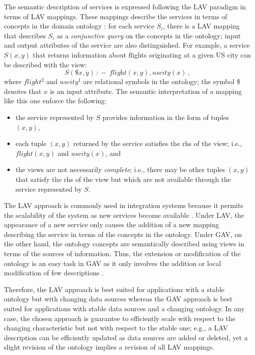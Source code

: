 \documentclass{llncs}
\newcommand{\qrule}{:\!\!-}
\newcommand{\flight}{\textit{flight}}
\newcommand{\UScity}{\textit{uscity}}
\begin{document}
The semantic description of services is expressed following the
LAV paradigm in terms of LAV mappings. These mappings describe the
services in terms of concepts in the domain ontology \cite{Ullman00}:
for each service $S_i$, there is a LAV mapping that describes $S_i$
as a \emph{conjunctive query} on the concepts in the ontology; 
input and output attributes of the service are also distinguished.
For example, a service $S(x,y)$ that returns information about
flights originating at a given US city can be described with the view:
\[ S(\$x,y)\ \qrule\ \flight(x,y), \UScity(x)\,, \]
where $flight^2$ and $uscity^1$ are relational symbols in the
ontology; the symbol \$ denotes that $x$ is an input attribute. 
The semantic interpretation of a mapping like this one enforce the following:
\begin{itemize}
\item the service represented by $S$ provides information in the
      form of tuples $(x,y)$,
\item each tuple $(x,y)$ returned by the service satisfies the rhs
      of the view; i.e., $\flight(x,y)$ and $\UScity(x)$, and
\item the views are not necessarily \emph{complete}; i.e., there may be
      other tuples $(x,y)$ that satisfy the rhs of the view but which
      are not available through the service represented by $S$.
\end{itemize}

The LAV approach is commonly used in integration systems because it permits
the scalability of the system as new services become available \cite{Ullman00}.
Under LAV, the appearance of a new service only causes the addition of a new
mapping describing the service in terms of the concepts in the ontology.
Under GAV, on the other hand, the ontology concepts are semantically described
using views in terms of the sources of information.
Thus, the extension or modification of the ontology is an easy task in GAV as
it only involves the addition or local modification of few descriptions
\cite{Ullman00}.

Therefore, the LAV approach is best suited for applications with a stable
ontology but with changing data sources whereas the GAV approach is best
suited for applications with stable data sources and a changing ontology.
In any case, the chosen approach is guarantee to efficiently scale with
respect to the changing characteristic but not with respect to the stable one;
e.g., a LAV description can be efficiently updated as data sources
are added or deleted, yet a slight revision of the ontology implies a
revision of all LAV mappings.
\end{document}
